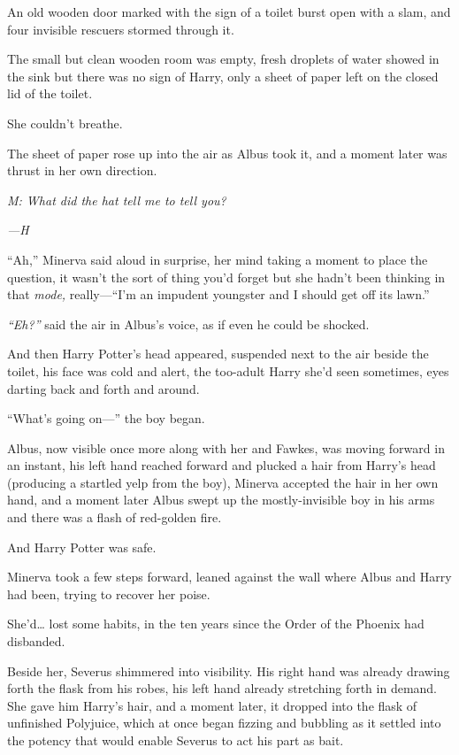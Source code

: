 An old wooden door marked with the sign of a toilet burst open with a
slam, and four invisible rescuers stormed through it.

The small but clean wooden room was empty, fresh droplets of water
showed in the sink but there was no sign of Harry, only a sheet of paper
left on the closed lid of the toilet.

She couldn't breathe.

The sheet of paper rose up into the air as Albus took it, and a moment
later was thrust in her own direction.

\emph{M: What did the hat tell me to tell you?}

\emph{---H}

``Ah,'' Minerva said aloud in surprise, her mind taking a moment to
place the question, it wasn't the sort of thing you'd forget but she
hadn't been thinking in that \emph{mode,} really---``I'm an impudent
youngster and I should get off its lawn.''

\emph{``Eh?''} said the air in Albus's voice, as if even he could be
shocked.

And then Harry Potter's head appeared, suspended next to the air beside
the toilet, his face was cold and alert, the too-adult Harry she'd seen
sometimes, eyes darting back and forth and around.

``What's going on---'' the boy began.

Albus, now visible once more along with her and Fawkes, was moving
forward in an instant, his left hand reached forward and plucked a hair
from Harry's head (producing a startled yelp from the boy), Minerva
accepted the hair in her own hand, and a moment later Albus swept up the
mostly-invisible boy in his arms and there was a flash of red-golden
fire.

And Harry Potter was safe.

Minerva took a few steps forward, leaned against the wall where Albus
and Harry had been, trying to recover her poise.

She'd\ldots{} lost some habits, in the ten years since the Order of the
Phoenix had disbanded.

Beside her, Severus shimmered into visibility. His right hand was
already drawing forth the flask from his robes, his left hand already
stretching forth in demand. She gave him Harry's hair, and a moment
later, it dropped into the flask of unfinished Polyjuice, which at once
began fizzing and bubbling as it settled into the potency that would
enable Severus to act his part as bait.

